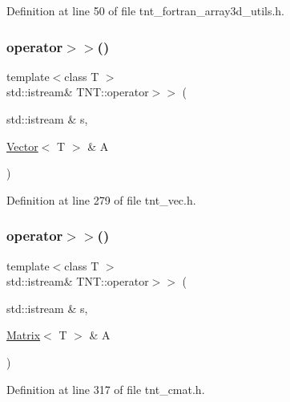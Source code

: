 Definition at line 50 of file tnt\+\_\+fortran\+\_\+array3d\+\_\+utils.\+h.

\mbox{\label{namespaceTNT_ad5d2fa6f96933cf8a6b3706a39582a64}} 
\subsubsection{\texorpdfstring{operator$>$$>$()}{operator>>()}\hspace{0.1cm}{\footnotesize\ttfamily [6/7]}}
{\footnotesize\ttfamily template$<$class T $>$ \\
std\+::istream\& T\+N\+T\+::operator$>$$>$ (\begin{DoxyParamCaption}\item[{std\+::istream \&}]{s,  }\item[{\hyperlink{classTNT_1_1Vector}{Vector}$<$ T $>$ \&}]{A }\end{DoxyParamCaption})}



Definition at line 279 of file tnt\+\_\+vec.\+h.

\mbox{\label{namespaceTNT_a7b2afad2ac4a2fba0673ddd9f95a8cb6}} 
\subsubsection{\texorpdfstring{operator$>$$>$()}{operator>>()}\hspace{0.1cm}{\footnotesize\ttfamily [7/7]}}
{\footnotesize\ttfamily template$<$class T $>$ \\
std\+::istream\& T\+N\+T\+::operator$>$$>$ (\begin{DoxyParamCaption}\item[{std\+::istream \&}]{s,  }\item[{\hyperlink{classTNT_1_1Matrix}{Matrix}$<$ T $>$ \&}]{A }\end{DoxyParamCaption})}



Definition at line 317 of file tnt\+\_\+cmat.\+h.

\mbox{\label{namespaceTNT_a8543f1b2361a96f1c80e0fb796199937}} 
